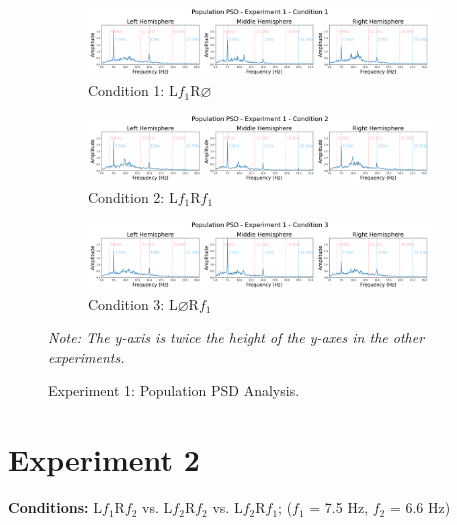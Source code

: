 \begin{figure}[hb]
    \centering
    
    \begin{subfigure}{1.0\textwidth}
        \includegraphics[width=\linewidth]{images/results/e100.png}
        \caption{Condition 1: L$f_{1}$R$\varnothing$}
        \label{fig:e100}
    \end{subfigure}
    
    \begin{subfigure}{1.0\textwidth}
        \includegraphics[width=\linewidth]{images/results/e101.png}
        \caption{Condition 2: L$f_{1}$R$f_{1}$}
        \label{fig:e101}
    \end{subfigure}
    
    \begin{subfigure}{1.0\textwidth}
        \includegraphics[width=\linewidth]{images/results/e102.png}
        \caption{Condition 3: L$\varnothing$R$f_{1}$}
        \label{fig:e102}
    \end{subfigure}
    \caption{Experiment 1: Population PSD Analysis.}
    \emph{Note: The y-axis is twice the height of the y-axes in the other experiments.}

    \label{fig:e1_population}
\end{figure}







\clearpage


\section{Experiment 2}
\textbf{Conditions:}  L$f_{1}$R$f_{2}$ vs. L$f_{2}$R$f_{2}$  vs. L$f_{2}$R$f_{1}$; ($f_{1}$ = 7.5 Hz, $f_{2}$ = 6.6 Hz)\\ 

